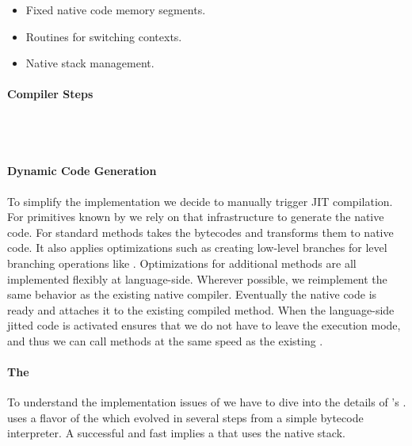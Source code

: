 \begin{itemize}[noitemsep]
	\item Fixed native code memory segments.
	\item Routines for switching contexts.
	\item Native stack management.
\end{itemize}


\paragraph{\NBJ Compiler Steps}
 \\
 \\


\paragraph{Dynamic Code Generation}
To simplify the implementation we decide to manually trigger JIT compilation.
For primitives known by \WF we rely on that infrastructure to generate the native code.
For standard methods \NBJ takes the bytecodes and transforms them to native code.
It also applies optimizations such as creating low-level branches for \ST level branching operations like .
Optimizations for additional methods are all implemented flexibly at language-side.
Wherever possible, we reimplement the same behavior as the existing native \JIT compiler.
Eventually the native code is ready and \B attaches it to the existing compiled method.
When the language-side jitted code is activated \B ensures that we do not have to leave the \JIT execution mode, and thus we can call methods at the same speed as the existing \JIT.


\paragraph{The \Cog \JIT}
To understand the implementation issues of \NBJ we have to dive into the details of \PH's \JIT.
\PH uses a flavor of the \Cog \VM which evolved in several steps from a simple bytecode interpreter.
A successful and fast \JIT implies a \VM that uses the native stack.

